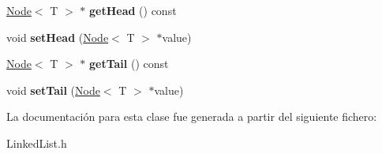\begin{DoxyCompactItemize}
\mbox{\label{classLinkedList_aa3a6d8c2f84442c1897c93abf88d0d32}} 
\hyperlink{classNode}{Node}$<$ T $>$ $\ast$ {\bfseries get\+Head} () const
\item 
\mbox{\label{classLinkedList_a92cdd1215ad1f296f94c687b80677522}} 
void {\bfseries set\+Head} (\hyperlink{classNode}{Node}$<$ T $>$ $\ast$value)
\item 
\mbox{\label{classLinkedList_a8d01157a38b64da506da805821c50dcc}} 
\hyperlink{classNode}{Node}$<$ T $>$ $\ast$ {\bfseries get\+Tail} () const
\item 
\mbox{\label{classLinkedList_a66d43c80117e430881a8d8e46cefbc01}} 
void {\bfseries set\+Tail} (\hyperlink{classNode}{Node}$<$ T $>$ $\ast$value)
\end{DoxyCompactItemize}


La documentación para esta clase fue generada a partir del siguiente fichero\+:\begin{DoxyCompactItemize}
\item 
Linked\+List.\+h\end{DoxyCompactItemize}
